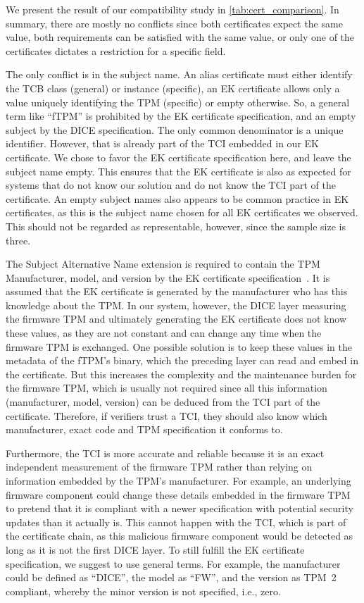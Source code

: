 We present the result of our compatibility study in \autoref{tab:cert_comparison}.
In summary, there are mostly no conflicts since both certificates expect the same value, both requirements can be satisfied with the same value, or only one of the certificates dictates a restriction for a specific field.



The only conflict is in the subject name.
An alias certificate must either identify the TCB class (general) or instance (specific), an EK certificate allows only a value uniquely identifying the TPM (specific) or empty otherwise.
So, a general term like ``fTPM'' is prohibited by the EK certificate specification, and an empty subject by the DICE specification.
The only common denominator is a unique identifier.
However, that is already part of the TCI embedded in our EK certificate.
We chose to favor the EK certificate specification here, and leave the subject name empty.
This ensures that the EK certificate is also as expected for systems that do not know our solution and do not know the TCI part of the certificate.
An empty subject names also appears to be common practice in EK certificates, as this is the subject name chosen for all EK certificates we observed.
This should not be regarded as representable, however, since the sample size is three.

The Subject Alternative Name extension is required to contain the TPM Manufacturer, model, and version by the EK certificate specification~\cite{tcg-ek}.
It is assumed that the EK certificate is generated by the manufacturer who has this knowledge about the TPM\@.
In our system, however, the DICE layer measuring the firmware TPM and ultimately generating the EK certificate does not know these values, as they are not constant and can change any time when the firmware TPM is exchanged.
One possible solution is to keep these values in the metadata of the fTPM's binary, which the preceding layer can read and embed in the certificate.
But this increases the complexity and the maintenance burden for the firmware TPM, which is usually not required since all this information (manufacturer, model, version) can be deduced from the TCI part of the certificate.
Therefore, if verifiers trust a TCI, they should also know which manufacturer, exact code and TPM specification it conforms to.

Furthermore, the TCI is more accurate and reliable because it is an exact independent measurement of the firmware TPM rather than relying on information embedded by the TPM's manufacturer.
For example, an underlying firmware component could change these details embedded in the firmware TPM to pretend that it is compliant with a newer specification with potential security updates than it actually is.
This cannot happen with the TCI, which is part of the certificate chain, as this malicious firmware component would be detected as long as it is not the first DICE layer.
To still fulfill the EK certificate specification, we suggest to use general terms.
For example, the manufacturer could be defined as ``DICE'', the model as ``FW'', and the version as TPM~2 compliant, whereby the minor version is not specified, i.e., zero.


